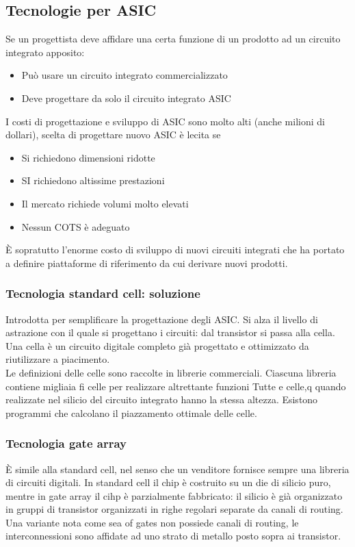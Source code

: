 \documentclass[12pt, oneside]{extbook}
\begin{document}
\subsection{Tecnologie per ASIC}
Se un progettista deve affidare una certa funzione di un prodotto ad un circuito integrato apposito:
\begin{itemize}
\item Può usare un circuito integrato commercializzato
\item Deve progettare da solo il circuito integrato ASIC
\end{itemize}
I costi di progettazione e sviluppo di ASIC sono molto alti (anche milioni di dollari), scelta di progettare nuovo ASIC è lecita se
\begin{itemize}
\item Si richiedono dimensioni ridotte
\item SI richiedono altissime prestazioni
\item Il mercato richiede volumi molto elevati
\item Nessun COTS è adeguato
\end{itemize}
È sopratutto l'enorme costo di sviluppo di nuovi circuiti integrati che ha portato a definire piattaforme di riferimento da cui derivare nuovi prodotti.
\subsubsection{Tecnologia standard cell: soluzione}
Introdotta per semplificare la progettazione degli ASIC. Si alza il livello di astrazione con il quale si progettano i circuiti: dal transistor si passa alla cella. Una cella è un circuito digitale completo già progettato e ottimizzato da riutilizzare a piacimento.\\ Le definizioni delle celle sono raccolte in librerie commerciali. Ciascuna libreria contiene migliaia fi celle per realizzare altrettante funzioni Tutte e celle,q quando realizzate nel silicio del circuito integrato hanno la stessa altezza. Esistono programmi che calcolano il piazzamento ottimale delle celle.
\subsubsection{Tecnologia gate array}
È simile alla standard cell, nel senso che un venditore fornisce sempre una libreria di circuiti digitali. In standard cell il chip è costruito su un die di silicio puro, mentre in gate array il cihp è parzialmente fabbricato: il silicio è già organizzato in gruppi di transistor organizzati in righe regolari separate da canali di routing.\\ Una variante nota come sea of gates non possiede canali di routing, le interconnessioni sono affidate ad uno strato di metallo posto sopra ai transistor.
\end{document}
